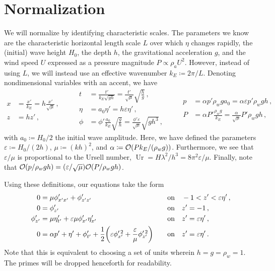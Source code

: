 \documentclass{jfm}
\DeclareMathOperator{\Ur}{Ur}
\renewcommand*{\epsilon}{\varepsilon}
\begin{document}
\section{Normalization}
We will normalize by identifying characteristic scales.
The parameters we know \apriori are the characteristic horizontal length
scale $L$ over which $\eta$ changes rapidly, the (initial) wave height
$H_0$, the depth $h$, the gravitational acceleration $g$, and the wind
speed $U$ expressed as a pressure magnitude $P \propto \rho_a U^2$.
However, instead of using $L$, we will instead use an effective
wavenumber $k_E \coloneqq 2 \pi/ L$.
Denoting nondimensional variables with an accent, we have
\begin{equation*}
  \begin{aligned}
  x &= \frac{x'}{k_E} = h \frac{x'}{\sqrt{\mu}}\,, \\
  z &= h z' \,,
  \end{aligned}
  \qquad
  \begin{aligned}
  t &= \frac{t'}{k_E\sqrt{g h}}
    = \frac{t'}{\sqrt{\mu}} \sqrt{\frac{h}{g}} \,, \\
  \eta &= a_0 \eta' = h \epsilon \eta' \,, \\
  \phi &= \phi'\frac{a_0}{k_E}\sqrt{\frac{g}{h}}
    = \frac{\phi'\epsilon}{\sqrt{\mu}}\sqrt{g h^3} \,,
  \end{aligned}
  \qquad
  \begin{aligned}
  p &= \alpha p' \rho_w g a_0
    = \alpha \epsilon p' \rho_w g h \,, \\
  P &= \alpha P' \frac{\rho_w g}{k_E}
    = \frac{\alpha}{\sqrt{\mu}} P' \rho_w g h \,,
  \end{aligned}
\end{equation*}
with $a_0 \coloneqq H_0/2$ the initial wave amplitude.
Here, we have defined the parameters $\epsilon \coloneqq H_0/(2h)$, $\mu
\coloneqq (kh)^2$, and $\alpha \coloneqq \order{P k_E/(\rho_w g)}$.
Furthermore, we see that $\epsilon/\mu$ is proportional to the Ursell
number, $\Ur = H \lambda^2/h^3 = 8 \pi^2 \epsilon/\mu$.
Finally, note that $\order{p/\rho_w g h} = (\epsilon/\sqrt{\mu})
\order{P/\rho_w g h}$.

Using these definitions, our equations take the form
\begin{alignat}{2}
  0 &= \mu \phi'_{x'x'} + \phi'_{z'z'} &&\qq{on}
    -1 < z' < \epsilon \eta' \,, \label{eq:laplace_nondim} \\
  0 &= \phi'_{z'} &&\qq{on} z'=-1 \,, \label{eq:bottom_bc_nondim} \\
  \phi'_{z'} &= \mu \eta'_{t'} +
    \epsilon \mu \phi'_{x'} \eta'_{x'} &&\qq{on} z' = \epsilon \eta' \,,
    \label{eq:kinematic_bc_nondim} \\
  0 &= \alpha p' +  \eta' + \phi'_{t'} + \frac{1}{2}
    \pqty{\epsilon \phi_{x'}^{\prime \, 2} + \frac{\epsilon}{\mu}
    \phi_{z'}^{\prime \, 2}} &&\qq{on} z'= \epsilon \eta' \,.
    \label{eq:dynamic_bc_nondim}
\end{alignat}
Note that this is equivalent to choosing a set of units wherein $h = g =
\rho_w = 1$.
The primes will be dropped henceforth for readability.
\end{document}
